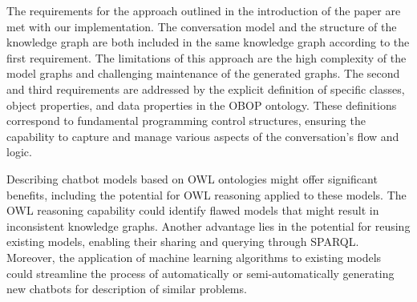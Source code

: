 \documentclass[runningheads]{llncs}
\begin{document}
The requirements for the approach outlined in the introduction of the paper are met with our implementation. The conversation model and the structure of the knowledge graph are both included in the same knowledge graph according to the first requirement. The limitations of this approach are the high complexity of the model graphs and challenging maintenance of the generated graphs. The second and third requirements are addressed by the explicit definition of specific classes, object properties, and data properties in the OBOP ontology. These definitions correspond to fundamental programming control structures, ensuring the capability to capture and manage various aspects of the conversation's flow and logic. 

Describing chatbot models based on OWL ontologies might offer significant benefits, including the potential for OWL reasoning applied to these models. The OWL reasoning capability could identify flawed models that might result in inconsistent knowledge graphs. Another advantage lies in the potential for reusing existing models, enabling their sharing and querying through SPARQL. Moreover, the application of machine learning algorithms to existing models could streamline the process of automatically or semi-automatically generating new chatbots for description of similar problems.

%
%
%


%
\end{document}
